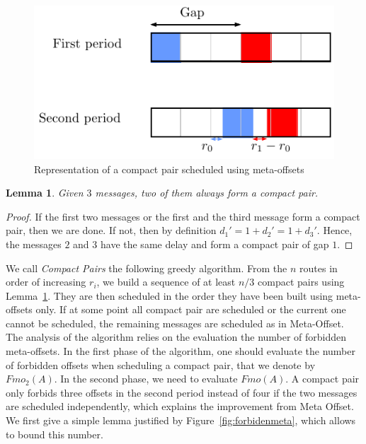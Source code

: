 \documentclass[10pt, conference, letterpaper]{IEEEtran}
\newtheorem{lemma}[theorem]{Lemma}
\begin{document}
\begin{figure}[h]
\begin{center}

\includegraphics[scale=0.7]{compact_pair}
\end{center}
\caption{Representation of a compact pair scheduled using meta-offsets}
\end{figure}

\begin{lemma}\label{lemma:pair_find}
Given $3$ messages, two of them always form a compact pair. 
\end{lemma}
\begin{proof}
If the first two messages or the first and the third message form a compact pair,
then we are done. If not, then by definition $d_{1}' = 1 + d_{2}' = 1 + d_{3}'$. Hence, the messages $2$ and $3$ have the same delay and form a compact pair of gap $1$.
\end{proof}

We call \emph{Compact Pairs} the following greedy algorithm. From the $n$ routes in order
of increasing $r_i$, we build a sequence of at least $n/3$ compact pairs using Lemma~\ref{lemma:pair_find}. They are then scheduled in the order they have been built using meta-offsets only. If at some point all compact pair are scheduled or the current one cannot be scheduled, the remaining messages are scheduled as in Meta-Offset. The analysis of the algorithm relies on the evaluation the number of forbidden meta-offsets. In the first phase
of the algorithm, one should evaluate the number of forbidden offsets when scheduling a compact pair, that we denote by $Fmo_2(A)$. In the second phase, we need to evaluate 
$Fmo(A)$. A compact pair only forbids three offsets in the second period instead of four if the two messages are scheduled independently, which explains the improvement from Meta Offset. We first give a simple lemma justified by Figure~\ref{fig:forbidenmeta}, which allows to bound this number.
\end{document}

